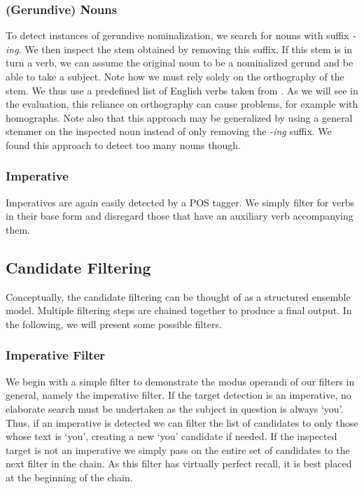 \documentclass[times, 10pt,twocolumn]{article}
\begin{document}
\subsubsection{(Gerundive) Nouns}\label{detection_gerundive_nouns}
To detect instances of gerundive nominalization, we search for nouns with suffix \textit{-ing}.
We then inspect the stem obtained by removing this suffix. If this stem is in turn a verb, we can
assume the original noun to be a nominalized gerund and be able to take a subject.
Note how we must rely solely on the orthography of the stem. We thus use a predefined list of
English verbs taken from \cite{pattern_library}.
As we will see in the evaluation, this reliance on orthography can cause problems, for example
with homographs.
Note also that this approach may be generalized by using a general stemmer on the inspected noun instead
of only removing the \textit{-ing} suffix. We found this approach to detect too many nouns though.




\subsubsection{Imperative}
Imperatives are again easily detected by a POS tagger. We simply filter for verbs in their base
form and disregard those that have an auxiliary verb accompanying them. 



\subsection{Candidate Filtering}\label{filters}
Conceptually, the candidate filtering can be thought of as a structured ensemble model.
Multiple filtering steps are chained together to produce a final output. In the following,
we will present some possible filters.


\subsubsection{Imperative Filter}
We begin with a simple filter to demonstrate the modus operandi of our filters in general, namely
the imperative filter. If the target detection is an imperative, no elaborate
search must be undertaken as the subject in question is always `you'. Thus, if an imperative
is detected we can filter the list of candidates to only those whose text is `you', creating
a new `you' candidate if needed. If the inspected target is not an imperative we simply
pass on the entire set of candidates to the next filter in the chain. As this filter
has virtually perfect recall, it is best placed at the beginning of the chain.
\end{document}
